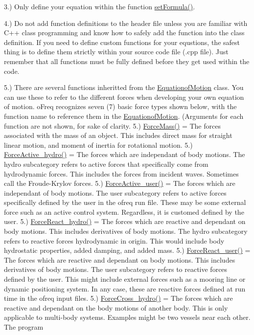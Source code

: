 3.) Only define your equation within the function \hyperlink{classosea_1_1ofreq_1_1_eqn_translation_af2681a6f73df8e8518d81eba5ac9152e}{set\-Formula()}.

4.) Do not add function definitions to the header file unless you are familiar with C++ class programming and know how to safely add the function into the class definition. If you need to define custom functions for your equstions, the safest thing is to define them strictly within your source code file (.cpp file). Just remember that all functions must be fully defined before they get used within the code.

5.) There are several functions inheritted from the \hyperlink{classosea_1_1ofreq_1_1_equationof_motion}{Equationof\-Motion} class. You can use these to refer to the different forces when developing your own equation of motion. o\-Freq recognizes seven (7) basic force types shown below, with the function name to reference them in the \hyperlink{classosea_1_1ofreq_1_1_equationof_motion}{Equationof\-Motion}. (Arguments for each function are not shown, for sake of clarity. 5.) \hyperlink{classosea_1_1ofreq_1_1_equationof_motion_a848b45b70d29d793b86a7c1ca8f97ed6}{Force\-Mass()} = The forces associated with the mass of an object. This includes direct mass for straight linear motion, and moment of inertia for rotational motion. 5.) \hyperlink{classosea_1_1ofreq_1_1_equationof_motion_a61f33c3fd47ae2b66db1982b9c973ec1}{Force\-Active\-\_\-hydro()} = The forces which are independant of body motions. The hydro subcategory refers to active forces that specifically come from hydrodynamic forces. This includes the forces from incident waves. Sometimes call the Froude-\/\-Krylov forces. 5.) \hyperlink{classosea_1_1ofreq_1_1_equationof_motion_a238df115825cbe08522bdc10b84880b9}{Force\-Active\-\_\-user()} = The forces which are independant of body motions. The user subcategory refers to active forces specifically defined by the user in the ofreq run file. These may be some external force such as an active control system. Regardless, it is customed defined by the user. 5.) \hyperlink{classosea_1_1ofreq_1_1_equationof_motion_a4962df48c786fced4e953e50f1d82a3a}{Force\-React\-\_\-hydro()} = The forces which are reactive and dependant on body motions. This includes derivatives of body motions. The hydro subcategory refers to reactive forces hydrodynamic in origin. This would include body hydrostatic properties, added damping, and added mass. 5.) \hyperlink{classosea_1_1ofreq_1_1_equationof_motion_ac1f572e423c09b9e9fa955f52434a8f7}{Force\-React\-\_\-user()} = The forces which are reactive and dependant on body motions. This includes derivatives of body motions. The user subcategory refers to reactive forces defined by the user. This might include external forces such as a mooring line or dynamic positioning system. In any case, these are reactive forces defined at run time in the ofreq input files. 5.) \hyperlink{classosea_1_1ofreq_1_1_equationof_motion_af1d1f42b77561e9f1c4110e16af309da}{Force\-Cross\-\_\-hydro()} = The forces which are reactive and dependant on the body motions of another body. This is only applicable to multi-\/body systems. Examples might be two vessels near each other. The program 